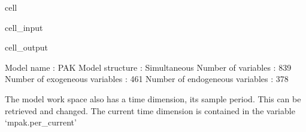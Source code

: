 \documentclass[letterpaper,10pt,english]{jupyterBook}
\begin{document}
\begin{sphinxuseclass}{cell}\begin{sphinxVerbatimInput}

\begin{sphinxuseclass}{cell_input}
\begin{sphinxVerbatim}[commandchars=\\\{\}]
\end{sphinxVerbatim}

\end{sphinxuseclass}\end{sphinxVerbatimInput}
\begin{sphinxVerbatimOutput}

\begin{sphinxuseclass}{cell_output}
\begin{sphinxVerbatim}[commandchars=\\\{\}]
\PYGZlt{}
Model name                              :                  PAK 
Model structure                         :         Simultaneous 
Number of variables                     :                  839 
Number of exogeneous  variables         :                  461 
Number of endogeneous variables         :                  378 
\PYGZgt{}
\end{sphinxVerbatim}

\end{sphinxuseclass}\end{sphinxVerbatimOutput}

\end{sphinxuseclass}
\sphinxAtStartPar
The model work space also has a time dimension, its sample period.  This can be retrieved and changed. The current time dimension is contained in the variable `mpak.per\_current’
\end{document}
